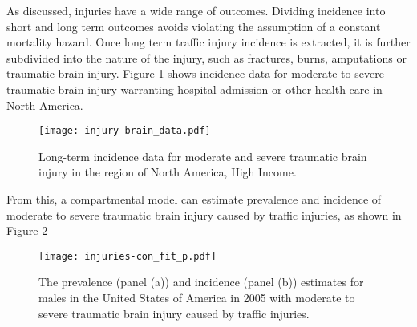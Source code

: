 As discussed, injuries have a wide range of outcomes.  Dividing incidence into short and long term outcomes avoids violating the assumption of a constant mortality hazard.  Once long term traffic injury incidence is extracted, it is further subdivided into the nature of the injury, such as fractures, burns, amputations or traumatic brain injury.  Figure \ref{fig:app-injury brain data} shows incidence data for moderate to severe traumatic brain injury warranting hospital admission or other health care in North America.

    \begin{figure}[h]
        \begin{center}
            \texttt{[image: injury-brain\_data.pdf]}
            \caption{Long-term incidence data for moderate and severe traumatic brain injury in the region of North America, High Income.}
            \label{fig:app-injury brain data}
        \end{center}
    \end{figure}

From this, a compartmental model can estimate prevalence and incidence of moderate to severe traumatic brain injury caused by traffic injuries, as shown in Figure \ref{fig:app-injury brain fit}

    \begin{figure}[h]
        \begin{center}
            \texttt{[image: injuries-con\_fit\_p.pdf]}
            \caption{The prevalence (panel (a)) and incidence (panel (b)) estimates for males in the United States of America in 2005 with moderate to severe traumatic brain injury caused by traffic injuries.}
            \label{fig:app-injury brain fit}
        \end{center}
    \end{figure}



